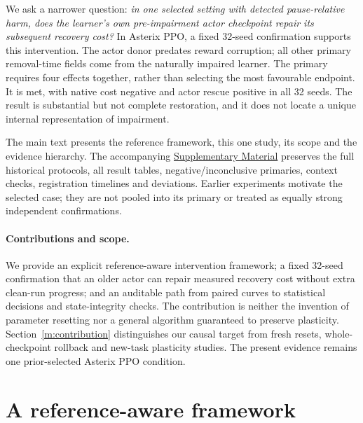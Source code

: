 \documentclass[10pt]{article}
\newcommand{\artifact}[2]{\href{https://github.com/Nityahapani/rlearlydamage/blob/main/#1}{#2}}
\begin{document}
We ask a narrower question: \emph{in one selected setting with detected pause-relative harm, does the learner's own pre-impairment actor checkpoint repair its subsequent recovery cost?} In Asterix PPO, a fixed 32-seed confirmation supports this intervention. The actor donor predates reward corruption; all other primary removal-time fields come from the naturally impaired learner. The primary requires four effects together, rather than selecting the most favourable endpoint. It is met, with native cost negative and actor rescue positive in all 32 seeds. The result is substantial but not complete restoration, and it does not locate a unique internal representation of impairment.

The main text presents the reference framework, this one study, its scope and the evidence hierarchy. The accompanying \artifact{paper/supplement.pdf}{Supplementary Material} preserves the full historical protocols, all result tables, negative/inconclusive primaries, context checks, registration timelines and deviations. Earlier experiments motivate the selected case; they are not pooled into its primary or treated as equally strong independent confirmations.

\paragraph{Contributions and scope.}
We provide an explicit reference-aware intervention framework; a fixed 32-seed confirmation that an older actor can repair measured recovery cost without extra clean-run progress; and an auditable path from paired curves to statistical decisions and state-integrity checks. The contribution is neither the invention of parameter resetting nor a general algorithm guaranteed to preserve plasticity. Section~\ref{m:contribution} distinguishes our causal target from fresh resets, whole-checkpoint rollback and new-task plasticity studies. The present evidence remains one prior-selected Asterix PPO condition.

\section{A reference-aware framework}\label{m:framework}
\end{document}
